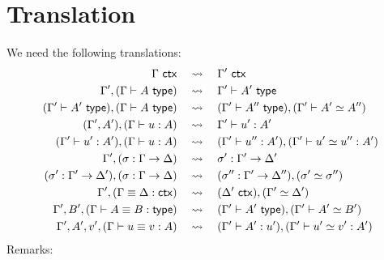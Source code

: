 
\section{Translation}
\label{sec:translation}

We need the following translations:
%
\begin{align}
  \label{lbl:ctx-ctr}
  \Gamma\ \mathsf{ctx}
  &\quad\leadsto\quad
  \Gamma'\ \mathsf{ctx}
  \\
  \label{lbl:ty-ctr}
  \Gamma', (\Gamma \vdash A \ \mathsf{type})
  &\quad\leadsto\quad
  \Gamma' \vdash A' \ \mathsf{type}
  \\
  \label{lbl:ty-path}
  (\Gamma' \vdash A' \ \mathsf{type}), (\Gamma \vdash A \ \mathsf{type})
  &\quad\leadsto\quad
  (\Gamma' \vdash A'' \ \mathsf{type}), (\Gamma' \vdash A' \simeq A'')
  \\
  \label{lbl:term-ctr}
  (\Gamma', A'), (\Gamma \vdash u : A)
  &\quad\leadsto\quad
  \Gamma' \vdash u' : A'
  \\
  \label{lbl:term-path}
  (\Gamma' \vdash u' : A'), (\Gamma \vdash u : A)
  &\quad\leadsto\quad
  (\Gamma' \vdash u'' : A'), (\Gamma' \vdash u' \simeq u'' : A')
  \\
  \Gamma', (\sigma : \Gamma \to \Delta)
  &\quad\leadsto\quad
  \sigma' : \Gamma' \to \Delta'
  \\
  (\sigma' : \Gamma' \to \Delta'), (\sigma : \Gamma \to \Delta)
  &\quad\leadsto\quad
  (\sigma'' : \Gamma' \to \Delta''), (\sigma' \simeq \sigma'')
  \\
  \label{lbl:eq-ctx-path}
  \Gamma', (\Gamma \equiv \Delta : \mathsf{ctx})
  &\quad\leadsto\quad
  (\Delta'\ \mathsf{ctx}), (\Gamma' \simeq \Delta')
  \\
  \label{lbl:eq-ty-path}
  \Gamma', B', (\Gamma \vdash A \equiv B : \mathsf{type})
  &\quad\leadsto\quad
  (\Gamma' \vdash A' \ \mathsf{type}), (\Gamma' \vdash A' \simeq B')
  \\
  \label{lbl:eq-term-path}
  \Gamma', A', v', (\Gamma \vdash u \equiv v : A)
  &\quad\leadsto\quad
  (\Gamma' \vdash A' : u'), (\Gamma' \vdash u' \simeq v' : A')
\end{align}
%
Remarks:
%
